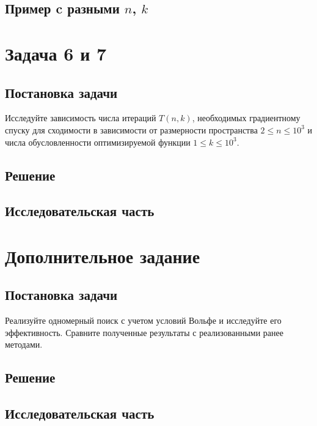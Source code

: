 \documentclass[12pt, a4paper, oneside]{article}
\begin{document}
	\subsection*{Пример c разными $n$, $k$}	
	\section*{Задача 6 и 7}
	\subsection*{Постановка задачи}
	Исследуйте зависимость числа итераций $T(n, k)$, необходимых градиентному спуску для сходимости в зависимости от размерности пространства $2 \leqslant n \leqslant 10^{3}$ и числа обусловленности оптимизируемой функции $1 \leqslant k \leqslant 10^{3}$.
	\subsection*{Решение}
	\subsection*{Исследовательская часть}
	\section*{Дополнительное задание}
	\subsection*{Постановка задачи}
	Реализуйте одномерный поиск с учетом условий Вольфе и исследуйте его эффективность. Сравните полученные результаты с реализованными ранее методами.
	\subsection*{Решение}
	\subsection*{Исследовательская часть}
\end{document}
